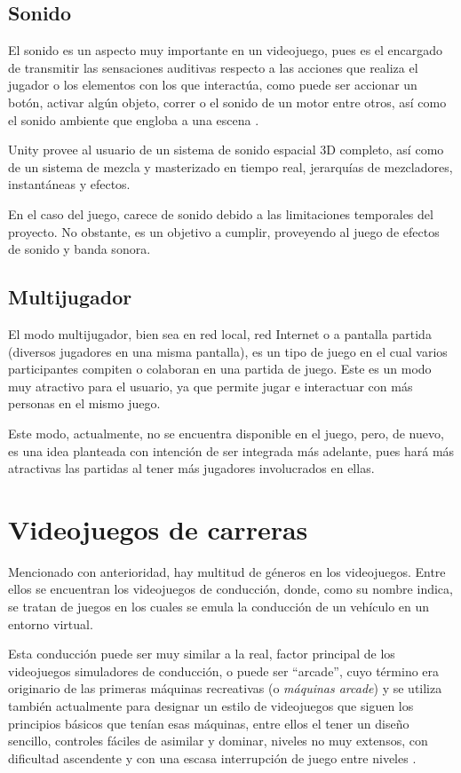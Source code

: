 \subsection{Sonido}

El sonido es un aspecto muy importante en un videojuego, pues es el encargado de transmitir las sensaciones auditivas respecto a las acciones que realiza el jugador o los elementos con los que interactúa, como puede ser accionar un botón, activar algún objeto, correr o el sonido de un motor entre otros, así como el sonido ambiente que engloba a una escena \cite{doc:sound}.

Unity provee al usuario de un sistema de sonido espacial 3D completo, así como de un sistema de mezcla y masterizado en tiempo real, jerarquías de mezcladores, instantáneas y efectos.

En el caso del juego, carece de sonido debido a las limitaciones temporales del proyecto. No obstante, es un objetivo a cumplir, proveyendo al juego de efectos de sonido y banda sonora.

\subsection{Multijugador}

El modo multijugador, bien sea en red local, red Internet o a pantalla partida (diversos jugadores en una misma pantalla), es un tipo de juego en el cual varios participantes compiten o colaboran en una partida de juego. Este es un modo muy atractivo para el usuario, ya que permite jugar e interactuar con más personas en el mismo juego.

Este modo, actualmente, no se encuentra disponible en el juego, pero, de nuevo, es una idea planteada con intención de ser integrada más adelante, pues hará más atractivas las partidas al tener más jugadores involucrados en ellas.

\section{Videojuegos de carreras} 

Mencionado con anterioridad, hay multitud de géneros en los videojuegos. Entre ellos se encuentran los videojuegos de conducción, donde, como su nombre indica, se tratan de juegos en los cuales se emula la conducción de un vehículo en un entorno virtual. 

Esta conducción puede ser muy similar a la real, factor principal de los videojuegos simuladores de conducción, o puede ser ``arcade'', cuyo término era originario de las primeras máquinas recreativas (o \textit{máquinas arcade}) y se utiliza también actualmente para designar un estilo de videojuegos que siguen los principios básicos que tenían esas máquinas, entre ellos el tener un diseño sencillo, controles fáciles de asimilar y dominar, niveles no muy extensos, con dificultad ascendente y con una escasa interrupción de juego entre niveles \cite{wikij:arcade}.

